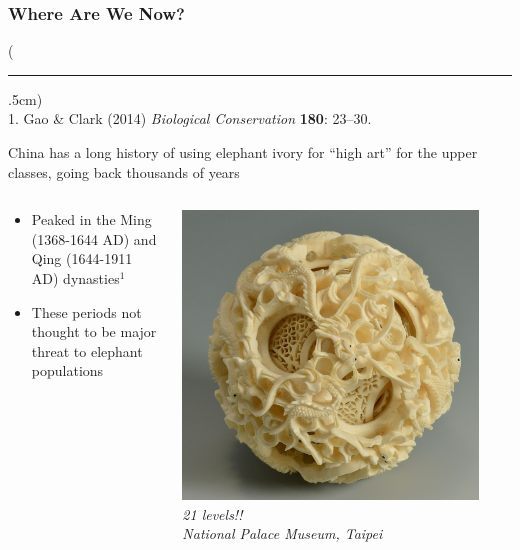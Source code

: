 \documentclass[10pt]{beamer}
\newenvironment{reference}[2]{%
	\begin{textblock*}{\textwidth}(#1,#2)
		\tiny\bgroup\color{gray}}{\egroup\end{textblock*}}
\begin{document}
\begin{frame}[t]
\frametitle{Where Are We Now?}
\vspace{0.5cm}

	\begin{reference}{4mm}{92mm}
		\rule{1.5cm}{0.25pt}\\
		1. Gao \& Clark (2014) \emph{Biological Conservation} \textbf{180}: 23--30.
	\end{reference}
	
	China has a long history of using elephant ivory for ``high art'' for the upper classes, going back thousands of years\\
	 
	\vspace{0.5cm}
	
	\begin{columns}
		\begin{column}{0.6\textwidth}
			\begin{itemize}
				\item Peaked in the Ming (1368-1644 AD) and Qing (1644-1911 AD) dynasties$^{1}$
				\medskip
				\item These periods not thought to be major threat to elephant populations
			\end{itemize}
		\end{column}
	
		\begin{column}{0.4\textwidth}
			\begin{center}
				\includegraphics[width=0.9\textwidth]{figures/ball.jpg}\\
				\tiny{\emph{21 levels!!}}\\
				\tiny{\emph{National Palace Museum, Taipei}}
			\end{center}
		\end{column}
	\end{columns}
\end{frame}
\end{document}
